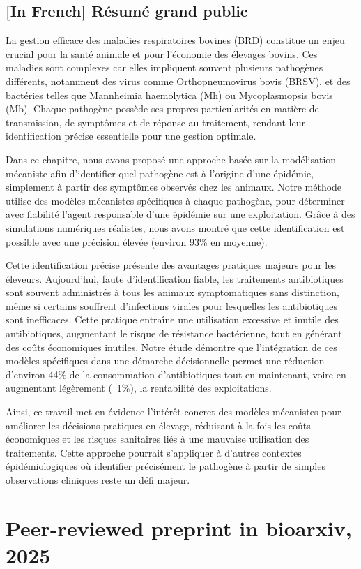 \subsection{[In French] Résumé grand public}
La gestion efficace des maladies respiratoires bovines (BRD) constitue un enjeu crucial pour la santé animale et pour l’économie des élevages bovins. Ces maladies sont complexes car elles impliquent souvent plusieurs pathogènes différents, notamment des virus comme Orthopneumovirus bovis (BRSV), et des bactéries telles que Mannheimia haemolytica (Mh) ou Mycoplasmopsis bovis (Mb). Chaque pathogène possède ses propres particularités en matière de transmission, de symptômes et de réponse au traitement, rendant leur identification précise essentielle pour une gestion optimale.

Dans ce chapitre, nous avons proposé une approche basée sur la modélisation mécaniste afin d’identifier quel pathogène est à l’origine d’une épidémie, simplement à partir des symptômes observés chez les animaux. Notre méthode utilise des modèles mécanistes spécifiques à chaque pathogène, pour déterminer avec fiabilité l’agent responsable d’une épidémie sur une exploitation. Grâce à des simulations numériques réalistes, nous avons montré que cette identification est possible avec une précision élevée (environ 93\% en moyenne).

Cette identification précise présente des avantages pratiques majeurs pour les éleveurs. Aujourd'hui, faute d’identification fiable, les traitements antibiotiques sont souvent administrés à tous les animaux symptomatiques sans distinction, même si certains souffrent d’infections virales pour lesquelles les antibiotiques sont inefficaces. Cette pratique entraîne une utilisation excessive et inutile des antibiotiques, augmentant le risque de résistance bactérienne, tout en générant des coûts économiques inutiles. Notre étude démontre que l’intégration de ces modèles spécifiques dans une démarche décisionnelle permet une réduction d'environ 44\% de la consommation d’antibiotiques tout en maintenant, voire en augmentant légèrement (~1\%), la rentabilité des exploitations.

Ainsi, ce travail met en évidence l’intérêt concret des modèles mécanistes pour améliorer les décisions pratiques en élevage, réduisant à la fois les coûts économiques et les risques sanitaires liés à une mauvaise utilisation des traitements. Cette approche pourrait s’appliquer à d’autres contextes épidémiologiques où identifier précisément le pathogène à partir de simples observations cliniques reste un défi majeur.


\section{Peer-reviewed preprint in bioarxiv, 2025}


    
